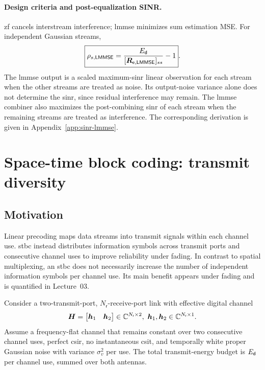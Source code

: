 \paragraph{Design criteria and post-equalization SINR.}
\ac{zf} cancels interstream interference; \ac{lmmse} minimizes
sum estimation MSE. For independent Gaussian streams,
\begin{equation}\label{eq:mmse-sinr}
	\boxed{\rho_{s,\mathsf{LMMSE}}
		=\frac{E_{\mathsf{d}}}{[\bm{R}_{\mathsf e,\mathsf{LMMSE}}]_{ss}}-1}.
\end{equation}
The \ac{lmmse} output is a scaled maximum-\ac{sinr} linear
observation for each stream when the other streams are treated
as noise. Its output-noise variance alone does not determine
the \ac{sinr}, since residual interference may remain.
The \ac{lmmse} combiner also maximizes the
post-combining \ac{sinr} of each stream when
the remaining streams are treated as interference.
The corresponding derivation is given in
Appendix~\ref{app:sinr-lmmse}.
\section{Space-time block coding: transmit diversity}\label{sec:stbc}

\subsection{Motivation}
Linear precoding maps data streams into transmit signals within each channel use. \Ac{stbc} instead distributes information symbols across transmit ports and consecutive channel uses to improve reliability under fading. In contrast to spatial multiplexing, an \ac{stbc} does not necessarily increase the number of independent information symbols per channel use. Its main benefit appears under fading and is quantified in Lecture~03.

Consider a two-transmit-port, \(N_{\mathsf r}\)-receive-port link with effective digital  channel
\begin{equation*}
\bm{H} = \begin{bmatrix}\bm{h}_1 & \bm{h}_2\end{bmatrix}\in\mathbb{C}^{N_{\mathsf{r}}\times 2}, ~ \bm{h}_1, \bm{h}_2 \in \mathbb{C}^{N_{\mathsf{r}} \times 1}.
\end{equation*}
Assume a frequency-flat channel that remains constant over two consecutive channel uses, perfect \ac{csir}, no instantaneous \ac{csit}, and temporally white proper Gaussian noise with variance \(\sigma_v^2\) per use. The total transmit-energy budget is \(E_{\mathsf{d}}\) per channel use, summed over both antennas.

